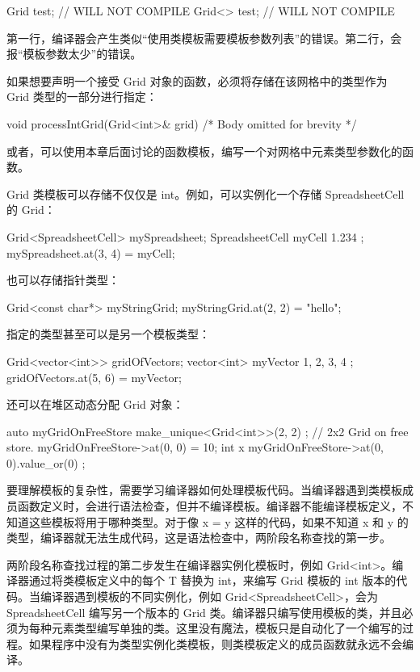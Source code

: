 \begin{cpp}
Grid test; // WILL NOT COMPILE
Grid<> test; // WILL NOT COMPILE
\end{cpp}

第一行，编译器会产生类似“使用类模板需要模板参数列表”的错误。第二行，会报“模板参数太少”的错误。

如果想要声明一个接受 Grid 对象的函数，必须将存储在该网格中的类型作为 Grid 类型的一部分进行指定：

\begin{cpp}
void processIntGrid(Grid<int>& grid) { /* Body omitted for brevity */ }
\end{cpp}

或者，可以使用本章后面讨论的函数模板，编写一个对网格中元素类型参数化的函数。

Grid 类模板可以存储不仅仅是 int。例如，可以实例化一个存储 SpreadsheetCell 的 Grid：

\begin{cpp}
Grid<SpreadsheetCell> mySpreadsheet;
SpreadsheetCell myCell { 1.234 };
mySpreadsheet.at(3, 4) = myCell;
\end{cpp}

也可以存储指针类型：

\begin{cpp}
Grid<const char*> myStringGrid;
myStringGrid.at(2, 2) = "hello";
\end{cpp}

指定的类型甚至可以是另一个模板类型：

\begin{cpp}
Grid<vector<int>> gridOfVectors;
vector<int> myVector { 1, 2, 3, 4 };
gridOfVectors.at(5, 6) = myVector;
\end{cpp}

还可以在堆区动态分配 Grid 对象：

\begin{cpp}
auto myGridOnFreeStore { make_unique<Grid<int>>(2, 2) }; // 2x2 Grid on free store.
myGridOnFreeStore->at(0, 0) = 10;
int x { myGridOnFreeStore->at(0, 0).value_or(0) };
\end{cpp}



要理解模板的复杂性，需要学习编译器如何处理模板代码。当编译器遇到类模板成员函数定义时，会进行语法检查，但并不编译模板。编译器不能编译模板定义，不知道这些模板将用于哪种类型。对于像 x = y 这样的代码，如果不知道 x 和 y 的类型，编译器就无法生成代码，这是语法检查中，两阶段名称查找的第一步。

两阶段名称查找过程的第二步发生在编译器实例化模板时，例如 Grid<int>。编译器通过将类模板定义中的每个 T 替换为 int，来编写 Grid 模板的 int 版本的代码。当编译器遇到模板的不同实例化，例如 Grid<SpreadsheetCell>，会为 SpreadsheetCell 编写另一个版本的 Grid 类。编译器只编写使用模板的类，并且必须为每种元素类型编写单独的类。这里没有魔法，模板只是自动化了一个编写的过程。如果程序中没有为类型实例化类模板，则类模板定义的成员函数就永远不会编译。

